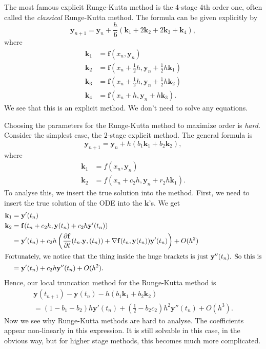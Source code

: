 \documentclass[a4paper]{article}
\begin{document}
\begin{eg}
  The most famous explicit Runge-Kutta method is the 4-stage 4th order one, often called the \emph{classical} Runge-Kutta method. The formula can be given explicitly by
  \[
    \mathbf{y}_{n + 1} = \mathbf{y}_n + \frac{h}{6}(\mathbf{k}_1 + 2\mathbf{k}_2 + 2\mathbf{k}_3 + \mathbf{k}_4),
  \]
  where
  \begin{align*}
    \mathbf{k}_1 &= \mathbf{f}(x_n, \mathbf{y}_n)\\
    \mathbf{k}_2 &= \mathbf{f}\left(x_n + \frac{1}{2}h, \mathbf{y}_n + \frac{1}{2}h \mathbf{k}_1\right)\\
    \mathbf{k}_3 &= \mathbf{f}\left(x_n + \frac{1}{2}h, \mathbf{y}_n + \frac{1}{2}h \mathbf{k}_2\right)\\
    \mathbf{k}_4 &= \mathbf{f}\left(x_n + h, \mathbf{y}_n + h \mathbf{k}_3\right).
  \end{align*}
  We see that this is an explicit method. We don't need to solve any equations.
\end{eg}
Choosing the parameters for the Runge-Kutta method to maximize order is \emph{hard}. Consider the simplest case, the $2$-stage explicit method. The general formula is
\[
  \mathbf{y}_{n + 1} = \mathbf{y}_n + h(b_1 \mathbf{k}_1 + b_2 \mathbf{k}_2),
\]
where
\begin{align*}
  \mathbf{k}_1 &= f(x_n, \mathbf{y}_n)\\
  \mathbf{k}_2 &= f(x_n + c_2 h, \mathbf{y}_n + r_2 h\mathbf{k}_1).
\end{align*}
To analyse this, we insert the true solution into the method. First, we need to insert the true solution of the ODE into the $\mathbf{k}$'s. We get
\begin{align*}
  \mathbf{k}_1 &= \mathbf{y}'(t_n)\\
  \mathbf{k}_2 &= \mathbf{f}(t_n + c_2 h, \mathbf{y}(t_n) + c_2 h \mathbf{y}'(t_n))\\
  &= \mathbf{y}'(t_n) + c_2 h \left(\frac{\partial \mathbf{f}}{\partial t}(t_n. \mathbf{y}, (t_n)) + \nabla \mathbf{f}(t_n, \mathbf{y}(t_n)) \mathbf{y}'(t_n)\right) + O(h^2)\\
  \intertext{Fortunately, we notice that the thing inside the huge brackets is just $\mathbf{y}''(t_n)$. So this is}
  &= \mathbf{y}'(t_n) + c_2 h \mathbf{y}''(t_n) + O(h^2).
\end{align*}
Hence, our local truncation method for the Runge-Kutta method is
\begin{multline*}
  \mathbf{y}(t_{n + 1}) - \mathbf{y}(t_n) - h(b_1 \mathbf{k}_1 + b_2 \mathbf{k}_2) \\
  = (1 - b_1 - b_2)h \mathbf{y}'(t_n) + \left(\frac{1}{2} - b_2 c_2\right) h^2 \mathbf{y}''(t_n) + O(h^3).
\end{multline*}
Now we see why Runge-Kutta methods are hard to analyse. The coefficients appear non-linearly in this expression. It is still solvable in this case, in the obvious way, but for higher stage methods, this becomes much more complicated.
\end{document}
